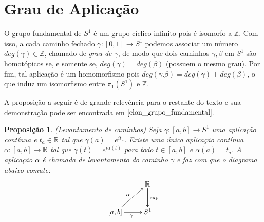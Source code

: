 \documentclass[12pt]{book}
\newtheorem{proposicao}[teorema]{Proposição}
\newcommand{\inteiros}{\mathbb{Z}}
\newcommand{\real}[1]{\mathbb{R}^{#1}}
\begin{document}
		\section{Grau de Aplicação}
		O grupo fundamental de $S^{1}$ é um grupo cíclico infinito pois é isomorfo a $\inteiros$. Com isso, a cada caminho fechado $\gamma:[0,1] \to S^{1}$ podemos associar um número $deg(\gamma) \in \inteiros$, chamado de \textit{grau de $\gamma$}, de modo que dois caminhos $\gamma, \beta$ em $S^{1}$ são homotópicos se, e somente se, $deg(\gamma) = deg(\beta)$ (possuem o mesmo grau). Por fim, tal aplicação é um homomorfismo pois $deg(\gamma.\beta)=deg(\gamma)+deg(\beta)$, o que induz um isomorfismo entre $\pi_{1}(S^{1})$ e $\inteiros$.
		
		A proposição a seguir é de grande relevência para o restante do texto e sua demonstração pode ser encontrada em $\cite{elon_grupo_fundamental}$.
		
		\begin{proposicao}\label{proposicao_levantamento_curvas}
			(Levantamento de caminhos) Seja $\gamma:[a,b] \to S^{1}$ uma aplicação contínua e $t_{a}\in \real{}$ tal que $\gamma(a) = e^{it_{a}}$. Existe uma única aplicação contínua $\alpha:[a,b] \to \real{}$ tal que $\gamma(t) = e^{i\alpha(t)}$ para todo $t\in [a,b]$ e $\alpha(a) = t_{a}$. A aplicação $\alpha$ é chamada de levantamento do caminho $\gamma$ e faz com que o diagrama abaixo comute:
			$$
			\xymatrix{
				& \real{}\ar[d]\ar[d]^{\text{exp}}
				\\
				[a,b]\ar[ur]^{\alpha} \ar[r]_{\gamma} & S^{1}
			}
			$$
		\end{proposicao}
		
\end{document}
